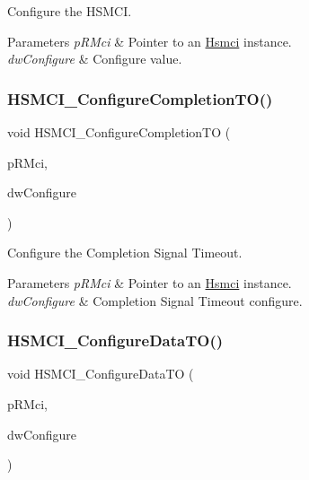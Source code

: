 Configure the H\+S\+M\+CI. 


\begin{DoxyParams}{Parameters}
{\em p\+R\+Mci} & Pointer to an \mbox{\hyperlink{structHsmci}{Hsmci}} instance. \\
\hline
{\em dw\+Configure} & Configure value. \\
\hline
\end{DoxyParams}
\mbox{\label{group__hsmci__functions_ga75c6f68a1b67b73c8b80482b5cc17c45}} 
\subsubsection{\texorpdfstring{HSMCI\_ConfigureCompletionTO()}{HSMCI\_ConfigureCompletionTO()}}
{\footnotesize\ttfamily void H\+S\+M\+C\+I\+\_\+\+Configure\+Completion\+TO (\begin{DoxyParamCaption}\item[{\mbox{\hyperlink{structHsmci}{Hsmci}} $\ast$}]{p\+R\+Mci,  }\item[{uint32\+\_\+t}]{dw\+Configure }\end{DoxyParamCaption})}



Configure the Completion Signal Timeout. 


\begin{DoxyParams}{Parameters}
{\em p\+R\+Mci} & Pointer to an \mbox{\hyperlink{structHsmci}{Hsmci}} instance. \\
\hline
{\em dw\+Configure} & Completion Signal Timeout configure. \\
\hline
\end{DoxyParams}
\mbox{\label{group__hsmci__functions_ga6668e349edf32e148bfd5fcf45b1eccc}} 
\subsubsection{\texorpdfstring{HSMCI\_ConfigureDataTO()}{HSMCI\_ConfigureDataTO()}}
{\footnotesize\ttfamily void H\+S\+M\+C\+I\+\_\+\+Configure\+Data\+TO (\begin{DoxyParamCaption}\item[{\mbox{\hyperlink{structHsmci}{Hsmci}} $\ast$}]{p\+R\+Mci,  }\item[{uint32\+\_\+t}]{dw\+Configure }\end{DoxyParamCaption})}



